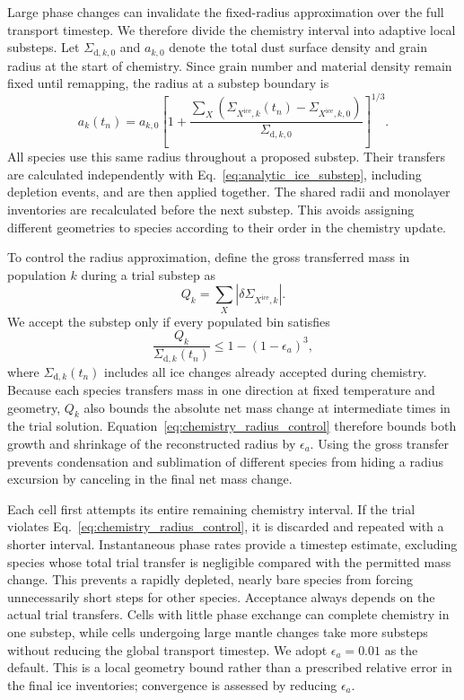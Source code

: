 Large phase changes can invalidate the fixed-radius approximation
over the full transport timestep. We therefore divide the chemistry
interval into adaptive local substeps. Let $\Sigma_{\mathrm d,k,0}$
and $a_{k,0}$ denote the total dust surface density and grain radius
at the start of chemistry. Since grain number and material density
remain fixed until remapping, the radius at a substep boundary is
\begin{equation}
    a_k(t_n)=a_{k,0}
    \left[1+\frac{\displaystyle\sum_X
    \left(\Sigma_{X^{\mathrm{ice}},k}(t_n)
    -\Sigma_{X^{\mathrm{ice}},k,0}\right)}
    {\Sigma_{\mathrm d,k,0}}\right]^{1/3}.
    \label{eq:simultaneous_radius_mass}
\end{equation}
All species use this same radius throughout a proposed substep.
Their transfers are calculated independently with
Eq.~\eqref{eq:analytic_ice_substep}, including depletion events,
and are then applied together. The shared radii and monolayer
inventories are recalculated before the next substep. This avoids
assigning different geometries to species according to their order
in the chemistry update.

To control the radius approximation, define the gross transferred
mass in population $k$ during a trial substep as
\begin{equation}
    Q_k=\sum_X\left|\delta\Sigma_{X^{\mathrm{ice}},k}\right|.
\end{equation}
We accept the substep only if every populated bin satisfies
\begin{equation}
    \frac{Q_k}{\Sigma_{\mathrm d,k}(t_n)}
    \leq 1-(1-\epsilon_a)^3,
    \label{eq:chemistry_radius_control}
\end{equation}
where $\Sigma_{\mathrm d,k}(t_n)$ includes all ice changes already
accepted during chemistry. Because each species transfers mass in
one direction at fixed temperature and geometry, $Q_k$ also bounds
the absolute net mass change at intermediate times in the trial
solution. Equation~\eqref{eq:chemistry_radius_control} therefore
bounds both growth and shrinkage of the reconstructed radius by
$\epsilon_a$. Using the gross transfer prevents condensation and
sublimation of different species from hiding a radius excursion by
canceling in the final net mass change.

Each cell first attempts its entire remaining chemistry interval.
If the trial violates Eq.~\eqref{eq:chemistry_radius_control}, it is
discarded and repeated with a shorter interval. Instantaneous phase
rates provide a timestep estimate, excluding species whose total
trial transfer is negligible compared with the permitted mass
change. This prevents a rapidly depleted, nearly bare species from
forcing unnecessarily short steps for other species. Acceptance
always depends on the actual trial transfers. Cells with little
phase exchange can complete chemistry in one substep, while cells
undergoing large mantle changes take more substeps without reducing
the global transport timestep. We adopt $\epsilon_a=0.01$ as the
default. This is a local geometry bound rather than a prescribed
relative error in the final ice inventories; convergence is assessed
by reducing $\epsilon_a$.

